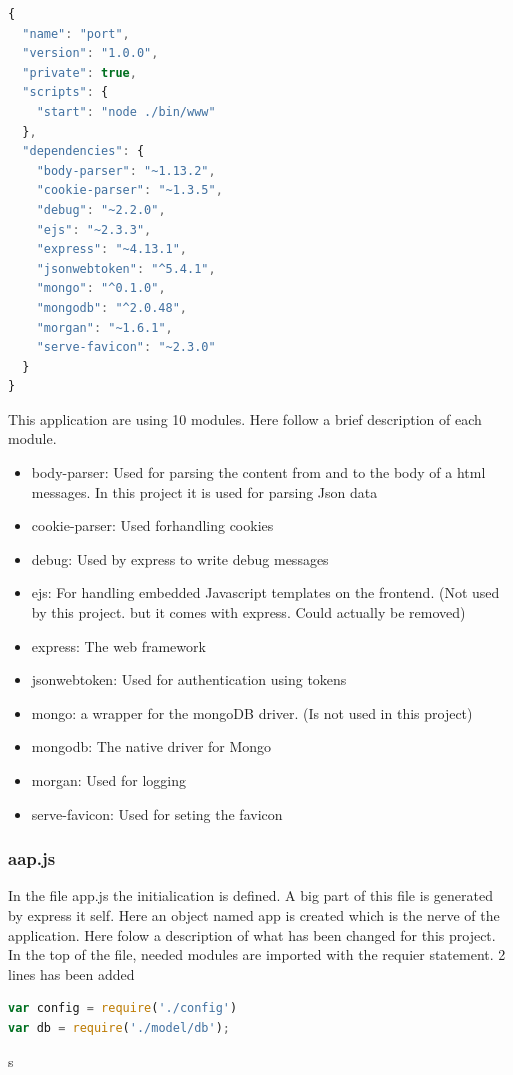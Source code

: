 \documentclass[a4paper,12pt,english]{article}
\begin{document}
\begin{lstlisting}[language=javascript]
{
  "name": "port",
  "version": "1.0.0",
  "private": true,
  "scripts": {
    "start": "node ./bin/www"
  },
  "dependencies": {
    "body-parser": "~1.13.2",
    "cookie-parser": "~1.3.5",
    "debug": "~2.2.0",
    "ejs": "~2.3.3",
    "express": "~4.13.1",
    "jsonwebtoken": "^5.4.1",
    "mongo": "^0.1.0",
    "mongodb": "^2.0.48",
    "morgan": "~1.6.1",
    "serve-favicon": "~2.3.0"
  }
}
\end{lstlisting}

This application are using 10 modules. Here follow a brief description of each
module.
\begin{itemize}
\item body-parser: Used for parsing the content from and to the body of a html
messages. In this project it is used for parsing Json data
\item cookie-parser: Used forhandling cookies
\item debug: Used by express to write debug messages
\item ejs: For handling embedded Javascript templates on the frontend. (Not
used by this project. but it comes with express. Could actually be removed)
\item express: The web framework
\item jsonwebtoken: Used for authentication using tokens
\item mongo: a wrapper for the mongoDB driver. (Is not used in this project)
\item mongodb: The native driver for Mongo
\item morgan: Used for logging
\item serve-favicon: Used for seting the favicon
\end{itemize}

\subsubsection{aap.js}
In the file app.js the initialication is defined. A big part of
this file is generated by express it self. Here an object named app is created
which is the nerve of the application. Here folow a description of what has
been changed for this project. In the top of the file, needed modules are
imported with the requier statement. 2 lines has been added

\begin{lstlisting}[language=javascript]
var config = require('./config')
var db = require('./model/db');
\end{lstlisting}s
\end{document}
